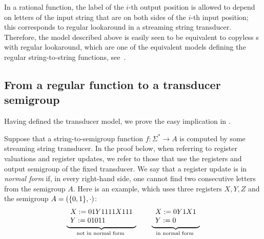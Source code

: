 In a rational function, the label of the $i$-th output position is allowed to depend on letters of the input string that are on both sides of the $i$-th input position; this corresponds to regular lookaround in a streaming string transducer. Therefore, the model described above is easily seen to be equivalent to copyless \sst{}s with regular lookaround, which are one of the equivalent models defining the regular string-to-string functions, see~\cite[Section~IV.C]{AlurFT12}.

\subsection{From a regular function to a transducer semigroup}
\label{sec:easy}

Having defined the transducer model, we prove the easy implication  in  . 

Suppose that a string-to-semigroup function $f\colon \Sigma^* \to A$ is computed by some streaming string transducer. In the proof below, when referring to register valuations and register updates, we refer to those that use the registers and output semigroup of the fixed transducer. We say that a register update is in \emph{normal form} if, in every right-hand side, one cannot find two consecutive letters from the semigroup $A$.
Here is an example, which uses three registers $X,Y,Z$ and the semigroup $A = (\{0,1\}, \cdot)$:
\begin{align*}
\myunderbrace{
\begin{array}{l}
    X:= 01Y1111X111\\
Y:= 01011
\end{array}
}{not in normal form}
\qquad 
\myunderbrace{
\begin{array}{l}
    X:= 0Y1X1\\
Y:= 0
\end{array}
}{in normal form}
\end{align*}

